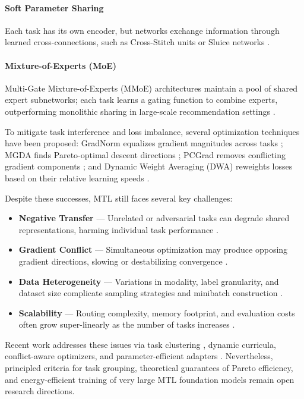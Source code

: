 \paragraph*{Soft Parameter Sharing}  
Each task has its own encoder, but networks exchange information through learned cross-connections, such as Cross-Stitch units \cite{misra2016cross} or Sluice networks \cite{ruder2017sluice}.
\paragraph*{Mixture-of-Experts (MoE)}  
Multi-Gate Mixture-of-Experts (MMoE) architectures maintain a pool of shared expert subnetworks; each task learns a gating function to combine experts, outperforming monolithic sharing in large-scale recommendation settings \cite{ma2018mmoe,yu2019mmoe}.

To mitigate task interference and loss imbalance, several optimization techniques have been proposed: GradNorm equalizes gradient magnitudes across tasks \cite{chen2018gradnorm}; MGDA finds Pareto-optimal descent directions \cite{sener2018mgda}; PCGrad removes conflicting gradient components \cite{yu2020pcgrad}; and Dynamic Weight Averaging (DWA) reweights losses based on their relative learning speeds \cite{liu2019dwa}.

Despite these successes, MTL still faces several key challenges:
\begin{itemize}
  \item \textbf{Negative Transfer} — Unrelated or adversarial tasks can degrade shared representations, harming individual task performance \cite{ruder2017sluice,zhang2021survey}.
  \item \textbf{Gradient Conflict} — Simultaneous optimization may produce opposing gradient directions, slowing or destabilizing convergence \cite{yu2020pcgrad,sener2018mgda}.
  \item \textbf{Data Heterogeneity} — Variations in modality, label granularity, and dataset size complicate sampling strategies and minibatch construction \cite{nash,standley2020tasks}.
  \item \textbf{Scalability} — Routing complexity, memory footprint, and evaluation costs often grow super-linearly as the number of tasks increases \cite{zhang2021survey,yu2024survey}.
\end{itemize}


Recent work addresses these issues via task clustering \cite{standley2020tasks}, dynamic curricula, conflict-aware optimizers, and parameter-efficient adapters \cite{yu2024survey}. Nevertheless, principled criteria for task grouping, theoretical guarantees of Pareto efficiency, and energy-efficient training of very large MTL foundation models remain open research directions.



